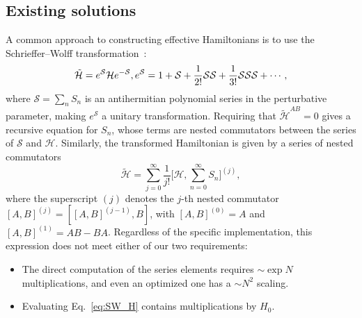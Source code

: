 \subsection{Existing solutions}
A common approach to constructing effective Hamiltonians is to use the Schrieffer--Wolff transformation~\cite{Schrieffer_1966}:
%
\begin{equation}
\tilde{\mathcal{H}} = e^\mathcal{S} \mathcal{H} e^{-\mathcal{S}}, \\
e^{\mathcal{S}} = 1 + \mathcal{S} + \frac{1}{2!} \mathcal{S} \mathcal{S}
+ \frac{1}{3!} \mathcal{S} \mathcal{S} \mathcal{S} + \cdots,
\end{equation}
%
where $\mathcal{S} = \sum_n S_n$ is an antihermitian polynomial series in the perturbative parameter, making $e^\mathcal{S}$ a unitary transformation.
Requiring that $\tilde{\mathcal{H}}^{AB} = 0$ gives a recursive equation for $S_n$, whose terms are nested commutators between the series of $\mathcal{S}$ and $\mathcal{H}$.
Similarly, the transformed Hamiltonian is given by a series of nested commutators
%
\begin{equation}
\label{eq:SW_H}
\tilde{\mathcal{H}} = \sum_{j=0}^\infty \frac{1}{j!} \Big [\mathcal{H}, \sum_{n=0}^{\infty} S_n \Big ]^{(j)},
\end{equation}
%
where the superscript $(j)$ denotes the $j$-th nested commutator $[A, B]^{(j)} = [[A, B]^{(j-1)}, B]$, with $[A, B]^{(0)} = A$ and $[A, B]^{(1)} = AB - BA$.
Regardless of the specific implementation, this expression does not meet either of our two requirements:
\begin{itemize}
  \item The direct computation of the series elements requires $\sim \exp N$ multiplications, and even an optimized one has a $\sim N^2$ scaling.
  \item Evaluating Eq.~\eqref{eq:SW_H} contains multiplications by $H_0$.
\end{itemize}

